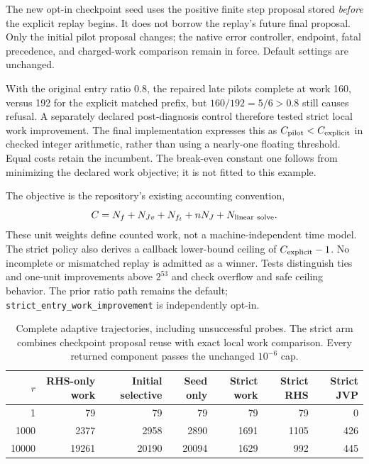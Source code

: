 The new opt-in checkpoint seed uses the positive finite step proposal stored
\emph{before} the explicit replay begins. It does not borrow the replay's
future final proposal. Only the initial pilot proposal changes; the native
error controller, endpoint, fatal precedence, and charged-work comparison
remain in force. Default settings are unchanged.

With the original entry ratio $0.8$, the repaired late pilots complete at
work 160, versus 192 for the explicit matched prefix, but $160/192=5/6>0.8$
still causes refusal. A separately declared post-diagnosis control therefore
tested strict local work improvement. The final implementation expresses this
as $C_{\rm pilot}<C_{\rm explicit}$ in checked integer arithmetic, rather than
using a nearly-one floating threshold. Equal costs retain the incumbent.
The break-even constant one follows from minimizing the declared work
objective; it is not fitted to this example.

The objective is the repository's existing accounting convention,
\begin{equation}
 C=N_f+N_{Jv}+N_{f_t}+nN_J+N_{\rm linear\ solve}.
\end{equation}
These unit weights define counted work, not a machine-independent time model.
The strict policy also derives a callback lower-bound ceiling of
$C_{\rm explicit}-1$. No incomplete or mismatched replay is admitted as a
winner. Tests distinguish ties and one-unit improvements above $2^{53}$ and
check overflow and safe ceiling behavior. The prior ratio path remains the
default; \texttt{strict\_entry\_work\_improvement} is independently opt-in.

\begin{table}[t]\centering
\caption{Complete adaptive trajectories, including unsuccessful probes.
The strict arm combines checkpoint proposal reuse with exact local work
comparison. Every returned component passes the unchanged $10^{-6}$ cap.}
\begin{tabular}{r r r r r r r}\toprule
$r$ & RHS-only work & Initial selective & Seed only & Strict work & Strict RHS & Strict JVP\\\midrule
1 &79&79&79&79&79&0\\
1000 &2377&2958&2890&1691&1105&426\\
10000 &19261&20190&20094&1629&992&445\\
\bottomrule\end{tabular}\label{tab:adapter}\end{table}

